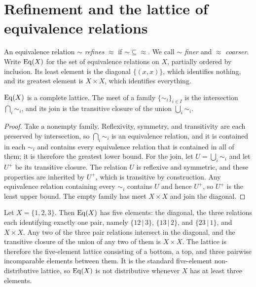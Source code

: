 \section{Refinement and the lattice of equivalence relations}

\begin{definition}[Refinement]
An equivalence relation $\sim$ \emph{refines} $\approx$ if ${\sim}\subseteq{\approx}$. We call $\sim$ \emph{finer} and $\approx$ \emph{coarser}. Write $\operatorname{Eq}(X)$ for the set of equivalence relations on $X$, partially ordered by inclusion. Its least element is the diagonal $\{(x,x)\}$, which identifies nothing, and its greatest element is $X\times X$, which identifies everything.
\end{definition}

\begin{established}\label{prop:lattice}
$\operatorname{Eq}(X)$ is a complete lattice. The meet of a family $\{{\sim_i}\}_{i\in I}$ is the intersection $\bigcap_i{\sim_i}$, and its join is the transitive closure of the union $\bigcup_i{\sim_i}$.
\end{established}
\begin{proof}
Take a nonempty family. Reflexivity, symmetry, and transitivity are each preserved by intersection, so $\bigcap_i{\sim_i}$ is an equivalence relation, and it is contained in each ${\sim_i}$ and contains every equivalence relation that is contained in all of them; it is therefore the greatest lower bound. For the join, let $U=\bigcup_i{\sim_i}$ and let $U^{+}$ be its transitive closure. The relation $U$ is reflexive and symmetric, and these properties are inherited by $U^{+}$, which is transitive by construction. Any equivalence relation containing every ${\sim_i}$ contains $U$ and hence $U^{+}$, so $U^{+}$ is the least upper bound. The empty family has meet $X\times X$ and join the diagonal.
\end{proof}

\begin{example}\label{ex:M3}
Let $X=\{1,2,3\}$. Then $\operatorname{Eq}(X)$ has five elements: the diagonal, the three relations each identifying exactly one pair, namely $\{12\,|\,3\}$, $\{13\,|\,2\}$, and $\{23\,|\,1\}$, and $X\times X$. Any two of the three pair relations intersect in the diagonal, and the transitive closure of the union of any two of them is $X\times X$. The lattice is therefore the five-element lattice consisting of a bottom, a top, and three pairwise incomparable elements between them. It is the standard five-element non-distributive lattice, so $\operatorname{Eq}(X)$ is not distributive whenever $X$ has at least three elements.
\end{example}

